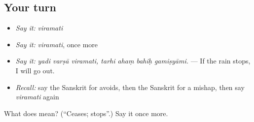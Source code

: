 \subsection*{Your turn}
\begin{itemize}
\raggedright
  \item \emph{Say it:} \emph{viramati}
  \item \emph{Say it:} \emph{viramati}, once more
  \item \emph{Say it:} \emph{yadi varṣā viramati, tarhi ahaṃ bahiḥ gamiṣyāmi.} — If the rain stops, I will go out.
  \item \emph{Recall:} say the Sanskrit for avoids, then the Sanskrit for a mishap, then say \emph{viramati} again
\end{itemize}

\begin{tcolorbox}[breakable,colback=teal!4,colframe=teal!35!black,title={Before you move on}]
What does  mean? (\textquotedblleft{}Ceases; stops\textquotedblright{}.) Say it once more.
\end{tcolorbox}
